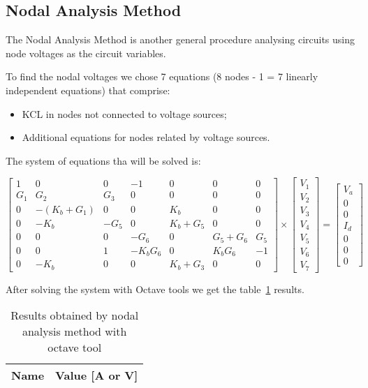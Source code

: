 \subsection{Nodal Analysis Method}

\hspace{0,5cm} The Nodal Analysis Method is another general procedure analysing circuits using node voltages as the circuit variables. 

To find the nodal voltages we chose 7 equations (8 nodes - 1 = 7 linearly independent equations) that comprise:
\begin{itemize}
\item  KCL in nodes not connected to voltage sources;

\item Additional equations for nodes related by voltage sources.
\end{itemize}


The system of equations tha will be solved is:

\begin{equation}
\begin{bmatrix} 
1 & 0 & 0 & -1 & 0 & 0 & 0  \\ 
G_1 & G_2 & G_3 & 0 & 0 & 0 & 0  \\
0 & -(K_b + G_1) & 0 & 0 & K_b & 0 & 0 \\ 
0 & -K_b & -G_5 & 0 & K_b + G_5 & 0 & 0 \\
0 & 0 & 0 & -G_6 & 0 & G_5 + G_6 & G_5 \\ 
0 & 0 & 1 & -K_b G_6 & 0 & K_b G_6 & -1 \\
0 & -K_b & 0 & 0 & K_b + G_3 & 0 & 0 
\end{bmatrix} 
\times
\begin{bmatrix} 
V_1 \\ 
V_2 \\ 
V_3 \\ 
V_4 \\ 
V_5 \\ 
V_6 \\ 
V_7
\end{bmatrix} =
\begin{bmatrix} 
V_a \\ 
0 \\ 
0 \\ 
I_d \\ 
0 \\ 
0 \\ 
0
\end{bmatrix}
\end{equation}


After solving the system with Octave tools we get the table~\ref{tab:nodal} results.

\begin{table}[h]
  \centering
  \begin{tabular}{|l|r|}
    \hline    
    {\bf Name} & {\bf Value [A or V]} \\ \hline
    
  \end{tabular}
  \caption{Results obtained by nodal analysis method with octave tool}
  \label{tab:nodal}
\end{table}

\lipsum[1-1]


